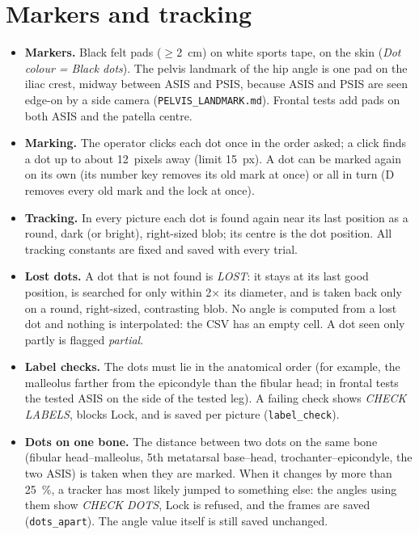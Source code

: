\documentclass[a4paper,10pt]{article}
\newcommand{\code}[1]{\texttt{#1}}
\begin{document}
\section{Markers and tracking}\label{sec:tracking}
\begin{itemize}
\item \textbf{Markers.} Black felt pads ($\geq$2~cm) on white sports tape, on the skin (\emph{Dot colour = Black dots}). The pelvis
  landmark of the hip angle is one pad on the iliac crest, midway between ASIS and PSIS, because ASIS and PSIS are seen edge-on by a
  side camera (\code{PELVIS\_LANDMARK.md}). Frontal tests add pads on both ASIS and the patella centre.
\item \textbf{Marking.} The operator clicks each dot once in the order asked; a click finds a dot up to about 12~pixels away (limit
  15~px). A dot can be marked again on its own (its number key removes its old mark at once) or all in turn (D removes every old mark and the lock at once).
\item \textbf{Tracking.} In every picture each dot is found again near its last position as a round, dark (or bright), right-sized
  blob; its centre is the dot position. All tracking constants are fixed and saved with every trial.
\item \textbf{Lost dots.} A dot that is not found is \emph{LOST}: it stays at its last good position, is searched for only within
  2$\times$ its diameter, and is taken back only on a round, right-sized, contrasting blob. No angle is computed from a lost dot and nothing
  is interpolated: the CSV has an empty cell. A dot seen only partly is flagged \emph{partial}.
\item \textbf{Label checks.} The dots must lie in the anatomical order (for example, the malleolus farther from the epicondyle than the
  fibular head; in frontal tests the tested ASIS on the side of the tested leg). A failing check shows \emph{CHECK LABELS}, blocks Lock, and is
  saved per picture (\code{label\_check}).
\item \textbf{Dots on one bone.} The distance between two dots on the same bone (fibular head--malleolus, 5th metatarsal base--head,
  trochanter--epicondyle, the two ASIS) is taken when they are marked. When it changes by more than 25~\%, a tracker has most likely jumped
  to something else: the angles using them show \emph{CHECK DOTS}, Lock is refused, and the frames are saved (\code{dots\_apart}). The angle
  value itself is still saved unchanged.
\end{itemize}
\end{document}
